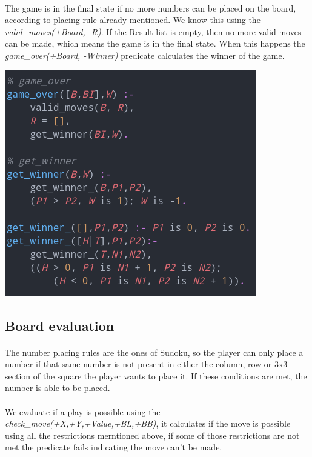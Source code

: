 \documentclass[a4paper]{article}
\begin{document}
\paragraph{}
The game is in the final state if no more numbers can be placed on the board, according to placing rule already 
mentioned. We know this using the \textit{valid\_moves(+Board, -R)}. If the Result list is empty, then no more valid
moves can be made, which means the game is in the final state. When this happens the \textit{game\_over(+Board, -Winner)}
predicate calculates the winner of the game.

\begin{center}
    \includegraphics[scale=0.4]{img/game_over.png}
\end{center}

\subsection{Board evaluation}
\paragraph{}
The number placing rules are the ones of Sudoku, so the player can only place a number if that same number is not present
in either the column, row or 3x3 section of the square the player wants to place it. If these conditions are met, 
the number is able to be placed.

\paragraph{}
We evaluate if a play is possible using the \textit{check\_move(+X,+Y,+Value,+BL,+BB)}, it calculates if the move is possible using 
all the restrictions merntioned  above, if some of those restrictions are not met the predicate fails indicating the move can't be made.
\end{document}
